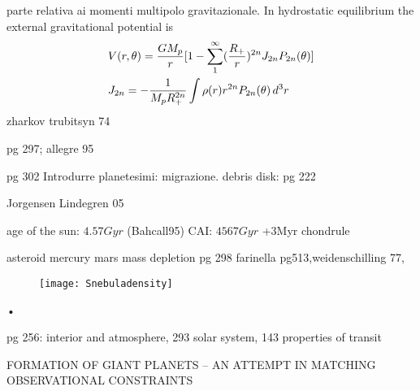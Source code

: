 \begin{workout}
parte relativa ai momenti multipolo gravitazionale. 
In hydrostatic equilibrium the external gravitational potential is
\begin{align}
&V(r,\theta)=\frac{GM_p}{r}[1-\sum_1^{\infty}(\frac{R_+}{r})^{2n}J_{2n}P_{2n}(\theta)]\\
&J_{2n}=-\frac{1}{M_pR_+^{2n}}\int\rho(r) r^{2n}P_{2n}(\theta)\,d^3r
\end{align}
zharkov trubitsyn 74
\end{workout}

\begin{workout}
pg 297; allegre 95
\end{workout}

\begin{workout}
pg 302
Introdurre planetesimi: migrazione. 
debris disk: pg 222
\end{workout}

\begin{workout}
Jorgensen Lindegren 05
\end{workout}

\begin{workout}
age of the sun: $4.57Gyr$ (Bahcall95)
CAI: $4567Gyr$ +3Myr chondrule
\end{workout}

\begin{workout}
asteroid mercury mars mass depletion pg 298
farinella pg513,weidenschilling 77,
\begin{figure}[!t]
\texttt{[image: Snebuladensity]}\label{fig:Snebuladensity}
\end{figure}•
\end{workout}

\begin{workout}
pg 256: interior and atmosphere, 293 solar system, 143 properties of transit
\end{workout}


\begin{workout}
FORMATION OF GIANT PLANETS – AN ATTEMPT IN MATCHING OBSERVATIONAL CONSTRAINTS
\end{workout}


